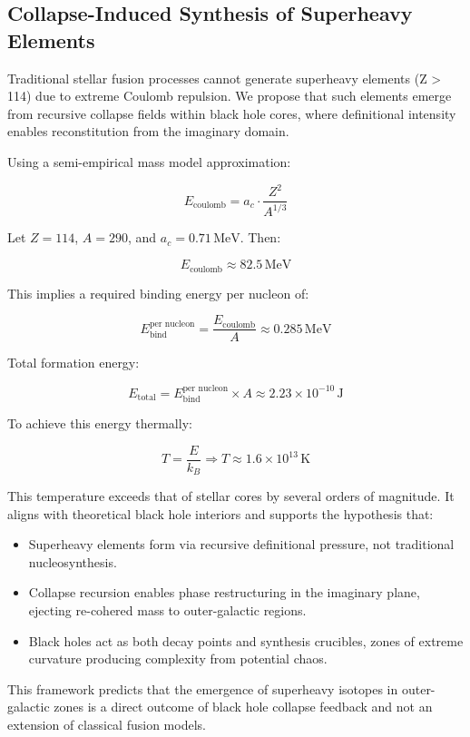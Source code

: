 \subsection{Collapse-Induced Synthesis of Superheavy Elements}\cite{blackhole_information_coherence}

Traditional stellar fusion processes cannot generate superheavy elements (Z > 114) due to extreme Coulomb repulsion. We propose that such elements emerge from recursive collapse fields within black hole cores, where definitional intensity enables reconstitution from the imaginary domain.

Using a semi-empirical mass model approximation:

\[
E_{\text{coulomb}} = a_c \cdot \frac{Z^2}{A^{1/3}}
\]

Let \( Z = 114 \), \( A = 290 \), and \( a_c = 0.71 \, \text{MeV} \). Then:

\[
E_{\text{coulomb}} \approx 82.5 \, \text{MeV}
\]

This implies a required binding energy per nucleon of:

\[
E_{\text{bind}}^{\text{per nucleon}} = \frac{E_{\text{coulomb}}}{A} \approx 0.285 \, \text{MeV}
\]

Total formation energy:

\[
E_{\text{total}} = E_{\text{bind}}^{\text{per nucleon}} \times A \approx 2.23 \times 10^{-10} \, \text{J}
\]

To achieve this energy thermally:

\[
T = \frac{E}{k_B} \Rightarrow T \approx 1.6 \times 10^{13} \, \text{K}
\]

This temperature exceeds that of stellar cores by several orders of magnitude. It aligns with theoretical black hole interiors and supports the hypothesis that:

\begin{itemize}
    \item Superheavy elements form via recursive definitional pressure, not traditional nucleosynthesis.
    \item Collapse recursion enables phase restructuring in the imaginary plane, ejecting re-cohered mass to outer-galactic regions.
    \item Black holes act as both decay points and synthesis crucibles, zones of extreme curvature producing complexity from potential chaos.
\end{itemize}

This framework predicts that the emergence of superheavy isotopes in outer-galactic zones is a direct outcome of black hole collapse feedback and not an extension of classical fusion models.


